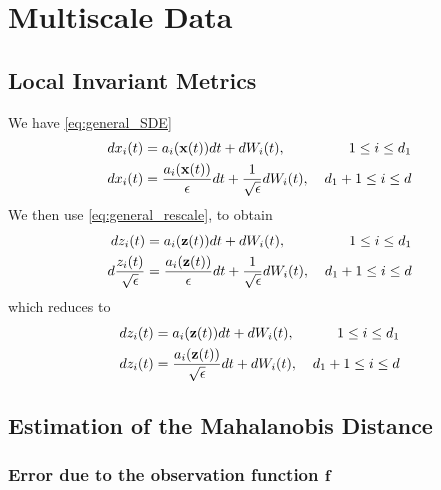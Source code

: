 \chapter{Multiscale Data\label{app:multiscale}}

\graphicspath{{ch-multiscale/figures/}}

\section{Local Invariant Metrics}

We have \eqref{eq:general_SDE}
\begin{equation}
\begin{aligned}
dx_i(t) &= a_i(\mathbf{x}(t)) dt + dW_i(t), & \: 1 \le i \le {d_1} \\
dx_i(t) &= \frac{a_i(\mathbf{x}(t))}{\epsilon} dt + \frac{1}{\sqrt{\epsilon}} dW_i(t) , & \: {d_1}+1 \le i \le d
\end{aligned}
\end{equation}
%
We then use \eqref{eq:general_rescale}, to obtain
%
\begin{equation}
\begin{aligned}
d z_i(t) &= a_i(\mathbf{z}(t)) dt + dW_i(t), & \: 1 \le i \le {d_1} \\
d \frac{z_i(t)}{\sqrt{\epsilon}} &= \frac{a_i(\mathbf{z}(t))}{\epsilon} dt + \frac{1}{\sqrt{\epsilon}} dW_i(t) , & \: {d_1}+1 \le i \le d
\end{aligned}
\end{equation}
%
which reduces to
%
\begin{equation}
\begin{aligned}
d z_i(t) &= a_i(\mathbf{z}(t)) dt + dW_i(t), & \: 1 \le i \le {d_1} \\
d z_i(t) &= \frac{a_i(\mathbf{z}(t))}{\sqrt{\epsilon}} dt + dW_i(t) , & \: {d_1}+1 \le i \le d
\end{aligned}
\end{equation}

\section{Estimation of the Mahalanobis Distance}

\subsection{Error due to the observation function $\mathbf{f}$}

